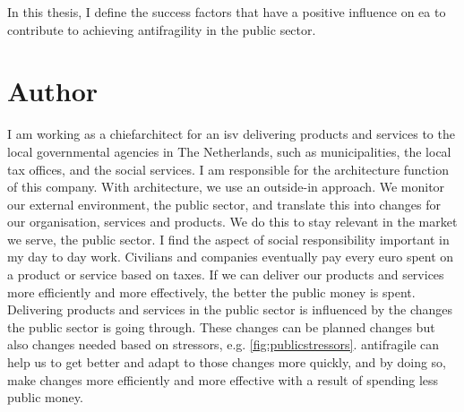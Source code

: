 In this thesis, I define the success factors that have a positive influence on \acrfull{ea} to contribute to achieving \gls{antifragility} in the public sector.
\section{Author}
\label{sec:author}
I am working as a \gls{chiefarchitect} for an \acrfull{isv} delivering products and services to the local governmental agencies in The Netherlands, such as municipalities, the local tax offices, and the social services. I am responsible for the architecture function of this company. With architecture, we use an outside-in approach. We monitor our external environment, the public sector, and translate this into changes for our organisation, services and products. We do this to stay relevant in the market we serve, the public sector. I find the aspect of social responsibility important in my day to day work. Civilians and companies eventually pay every euro spent on a product or service based on taxes. If we can deliver our products and services more efficiently and more effectively, the better the public money is spent. Delivering products and services in the public sector is influenced by the changes the public sector is going through. These changes can be planned changes but also changes needed based on \glspl{stressor}, e.g. \cref{fig:publicstressors}. \Gls{antifragile} can help us to get better and adapt to those changes more quickly, and by doing so, make changes more efficiently and more effective with a result of spending less public money.

